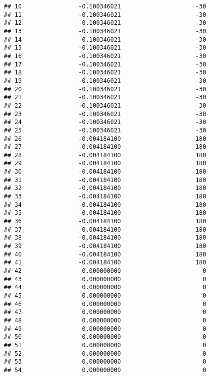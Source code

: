 \documentclass[]{article}
\begin{document}
\begin{verbatim}
## 10                -0.100346021                     -30
## 11                -0.100346021                     -30
## 12                -0.100346021                     -30
## 13                -0.100346021                     -30
## 14                -0.100346021                     -30
## 15                -0.100346021                     -30
## 16                -0.100346021                     -30
## 17                -0.100346021                     -30
## 18                -0.100346021                     -30
## 19                -0.100346021                     -30
## 20                -0.100346021                     -30
## 21                -0.100346021                     -30
## 22                -0.100346021                     -30
## 23                -0.100346021                     -30
## 24                -0.100346021                     -30
## 25                -0.100346021                     -30
## 26                -0.004184100                     180
## 27                -0.004184100                     180
## 28                -0.004184100                     180
## 29                -0.004184100                     180
## 30                -0.004184100                     180
## 31                -0.004184100                     180
## 32                -0.004184100                     180
## 33                -0.004184100                     180
## 34                -0.004184100                     180
## 35                -0.004184100                     180
## 36                -0.004184100                     180
## 37                -0.004184100                     180
## 38                -0.004184100                     180
## 39                -0.004184100                     180
## 40                -0.004184100                     180
## 41                -0.004184100                     180
## 42                 0.000000000                       0
## 43                 0.000000000                       0
## 44                 0.000000000                       0
## 45                 0.000000000                       0
## 46                 0.000000000                       0
## 47                 0.000000000                       0
## 48                 0.000000000                       0
## 49                 0.000000000                       0
## 50                 0.000000000                       0
## 51                 0.000000000                       0
## 52                 0.000000000                       0
## 53                 0.000000000                       0
## 54                 0.000000000                       0

\end{verbatim}
\end{document}
